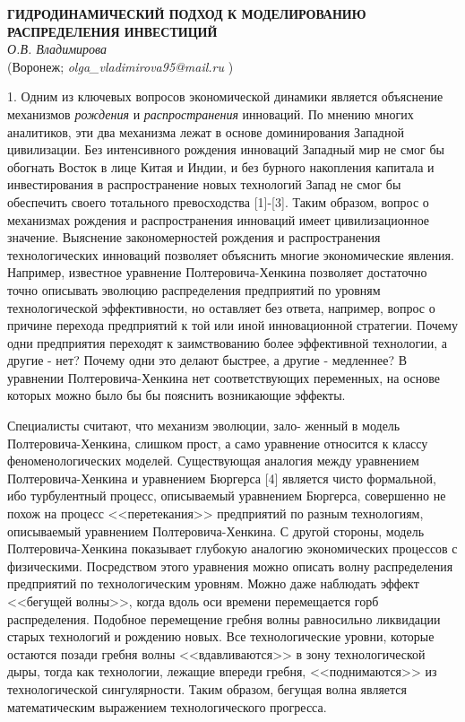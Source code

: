 \begin{center}{ \bf  ГИДРОДИНАМИЧЕСКИЙ
ПОДХОД К МОДЕЛИРОВАНИЮ РАСПРЕДЕЛЕНИЯ ИНВЕСТИЦИЙ}\\
{\it О.В. Владимирова} \\
(Воронеж; {\it olga\_vladimirova95@mail.ru} )
\end{center}


1. Одним из ключевых вопросов экономической динамики является
объяснение механизмов {\em рождения} и {\em распространения}
инноваций. По мнению многих аналитиков, эти два механизма лежат в
основе доминирования Западной цивилизации. Без интенсивного рождения
инноваций Западный мир не смог бы обогнать Восток в лице Китая и
Индии, и без бурного накопления капитала и инвестирования в
распространение новых технологий Запад не смог бы обеспечить своего
тотального превосходства [1]-[3]. Таким образом, вопрос о механизмах
рождения и распространения инноваций имеет цивилизационное значение.
Выяснение закономерностей рождения и распространения технологических
инноваций позволяет объяснить многие экономические явления.
Например, известное уравнение Пол\-те\-ро\-ви\-ча-Хен\-ки\-на
позволяет достаточно точно описывать эволюцию распределения
предприятий по уровням технологической эффективности, но оставляет
без ответа, например, вопрос о причине перехода предприятий к той
или иной инновационной стратегии. Почему одни предприятия переходят
к заимствованию более эффективной технологии, а другие - нет? Почему
одни это делают быстрее, а другие - медленнее? В уравнении
Полте\-ро\-ви\-ча-Хен\-ки\-на нет соответствующих переменных, на
основе которых можно было бы бы пояснить возникающие эффекты.

Специалисты считают, что механизм эволюции, зало-
\linebreak
женный в модель
Полтеровича-Хенкина, слишком прост, а само уравнение относится к
классу феноменологических моделей. Существующая аналогия между
уравнением Пол\-те\-ро\-ви\-ча-Хен\-ки\-на и уравнением Бюргерса [4]
является чисто формальной, ибо турбулентный процесс, описываемый
уравнением Бюргерса, совершенно не похож на процесс <<перетекания>>
предприятий по разным технологиям, описываемый уравнением
Полтеровича-Хенкина. С другой стороны, модель
Полтеровича-Хен\-ки\-на показывает глубокую аналогию экономических
процессов с физическими. Посредством этого уравнения можно описать
волну распределения предприятий по технологическим уровням. Можно
даже наблюдать эффект <<бегущей волны>>, когда вдоль оси времени
перемещается горб распределения. Подобное перемещение гребня волны
равносильно ликвидации старых технологий и рождению новых. Все
технологические уровни, которые остаются позади гребня волны
<<вдавливаются>> в зону технологической дыры, тогда как технологии,
лежащие впереди гребня, <<поднимаются>> из технологической
сингулярности. Таким образом, бегущая волна является математическим
выражением технологического прогресса.

